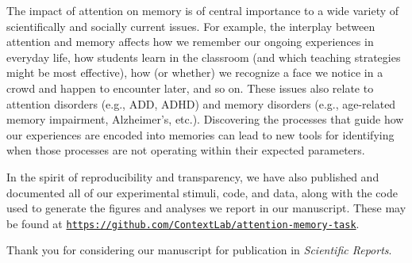 \documentclass[10pt,stdletter,orderfromtodate,sigleft]{newlfm}
\begin{document}
\begin{newlfm}
The impact of attention on memory is of central importance to a wide variety of
scientifically and socially current issues. For example, the interplay between
attention and memory affects how we remember our ongoing experiences in
everyday life, how students learn in the classroom (and which teaching
strategies might be most effective), how (or whether) we recognize a face we
notice in a crowd and happen to encounter later, and so on. These issues also
relate to attention disorders (e.g., ADD, ADHD) and memory disorders (e.g.,
age-related memory impairment, Alzheimer's, etc.). Discovering the processes
that guide how our experiences are encoded into memories can lead to new tools
for identifying when those processes are not operating within their expected
parameters.

In the spirit of reproducibility and transparency, we have also published and
documented all of our experimental stimuli, code, and data, along with the code
used to generate the figures and analyses we report in our manuscript. These
may be found at
\href{https://github.com/ContextLab/attention-memory-task}{\texttt{https://github.com/ContextLab/attention-memory-task}}.

Thank you for considering our manuscript for publication in \textit{Scientific Reports}.

\end{newlfm}
\end{document}
